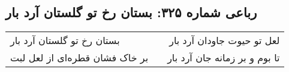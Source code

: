 \begin{center}
\section*{رباعی شماره ۳۲۵: بستان رخ تو گلستان آرد بار}
\label{sec:sh325}
\begin{longtable}{l p{0.5cm} r}
بستان رخ تو گلستان آرد بار
&&
لعل تو حیوت جاودان آرد بار
\\
بر خاک فشان قطره‌ای از لعل لبت
&&
تا بوم و بر زمانه جان آرد بار
\\
\end{longtable}
\end{center}
